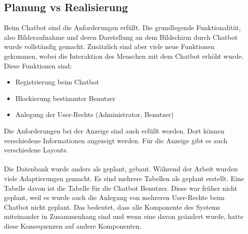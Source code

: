 \subsection{Planung vs Realisierung}
Beim Chatbot sind die Anforderungen erfüllt. Die grundlegende Funktionalität, also Bilderaufnahme und deren Darstellung an dem Bildschirm durch Chatbot wurde vollständig gemacht. Zusätzlich sind aber viele neue Funktionen gekommen, wobei die Interaktion des Menschen mit dem Chatbot erhöht wurde. \\
Diese Funktionen sind:
\begin{itemize}
	\item Registrierung beim Chatbot
\end{itemize}
\begin{itemize}
	\item Blockierung bestimmter Benutzer
\end{itemize}
\begin{itemize}
	\item Anlegung der User-Rechte (Administrator, Benutzer)
\end{itemize}
Die Anforderungen bei der Anzeige sind auch erfüllt worden. Dort können verschiedene Informationen angezeigt werden. Für die Anzeige gibt es auch verschiedene Layouts. \\
\\
Die Datenbank wurde anders als geplant, gebaut. Während der Arbeit wurden viele Adaptierungen gemacht. Es sind mehrere Tabellen als geplant erstellt. Eine Tabelle davon ist die Tabelle für die Chatbot Benutzer. Diese war früher nicht geplant, weil es wurde auch die Anlegung von mehreren User-Rechte beim Chatbot nicht geplant. Das bedeutet, dass alle Komponente des Systems miteinander in Zusammenhang sind und wenn eine davon geändert wurde, hatte diese Konsequenzen auf andere Komponenten.  

